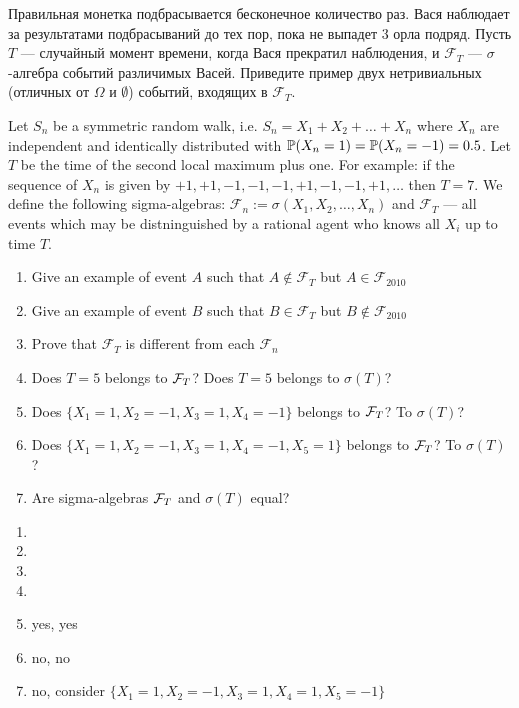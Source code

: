 \begin{problem}
Правильная монетка подбрасывается бесконечное количество раз. Вася наблюдает за результатами подбрасываний до тех пор, пока не выпадет 3 орла подряд. Пусть $T$ — случайный момент времени, когда Вася прекратил наблюдения, и $ \mathcal{F}_{T}$ — $\sigma$-алгебра событий различимых Васей. Приведите пример двух нетривиальных (отличных от $ \Omega$ и  $\emptyset$) событий, входящих в $\mathcal{F}_T$.

\begin{sol}

\end{sol}
\end{problem}

\begin{problem}
Let $S_{n}$ be a symmetric random walk, i.e. $ S_{n}=X_{1}+X_{2}+\ldots+X_{n} $ where $ X_{n} $ are independent and identically distributed with $ \P(X_{n}=1)=\P(X_{n}=-1)=0.5 $. Let $T$ be the time of the second local maximum plus one. For example: if the sequence of $ X_{n} $ is given by $ +1,+1,-1,-1,-1,+1,-1,-1,+1,\ldots$ then $T=7$. We define the following sigma-algebras: $ \mathcal{F}_{n}:=\sigma(X_{1},X_{2},\ldots,X_{n})$ and $ \mathcal{F}_{T} $ — all events which may be distninguished by a rational agent who knows all $ X_{i} $ up to time $ T $.
\begin{enumerate}
\item Give an example of event $A$ such that $ A\notin \mathcal{F}_{T} $ but $ A\in \mathcal{F}_{2010} $
\item Give an example of event $B$ such that $ B\in \mathcal{F}_{T} $ but $ B\notin \mathcal{F}_{2010} $
\item Prove that $ \mathcal{F}_{T} $ is different from each $ \mathcal{F}_{n} $
\item Does $T=5$ belongs to $\cF_T$? Does $T=5$ belongs to $\sigma(T)$?
\item Does $\{X_1 = 1, X_2 = -1, X_3 = 1, X_4 = -1 \}$ belongs to $\cF_T$? To $\sigma(T)$?
\item Does $\{X_1 = 1, X_2 = -1, X_3 = 1, X_4 = -1, X_5 = 1 \}$ belongs to $\cF_T$? To $\sigma(T)$?
\item Are sigma-algebras $\cF_T$ and $\sigma(T)$ equal?
\end{enumerate}


\begin{sol}
  \begin{enumerate}
    \item
    \item
    \item
    \item
    \item yes, yes
    \item no, no
    \item no, consider $\{X_1 = 1, X_2 = -1, X_3 = 1, X_4 = 1, X_5 = -1 \}$
  \end{enumerate}
\end{sol}
\end{problem}

